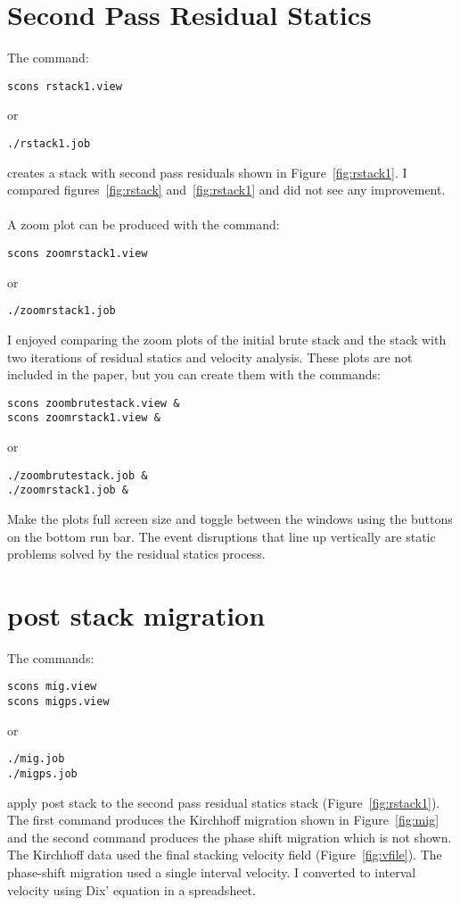 
\section{Second Pass Residual Statics}
The command:
\begin{verbatim}
scons rstack1.view
\end{verbatim}
or
\begin{verbatim}
./rstack1.job
\end{verbatim}
creates a stack with second pass residuals shown in Figure~\ref{fig:rstack1}.  
I compared figures~\ref{fig:rstack} and~\ref{fig:rstack1} and did not see 
any improvement.\\
\\  
A zoom plot can be produced with the command:
\begin{verbatim}
scons zoomrstack1.view
\end{verbatim}
or
\begin{verbatim}
./zoomrstack1.job
\end{verbatim}

I enjoyed comparing the zoom plots of the initial brute stack and the stack 
with two iterations of residual statics and velocity analysis.  These plots
are not included in the paper, but you can create them with the
commands:
\begin{verbatim}
scons zoombrutestack.view & 
scons zoomrstack1.view & 
\end{verbatim}
or
\begin{verbatim}
./zoombrutestack.job & 
./zoomrstack1.job & 
\end{verbatim}
Make the plots full screen size and toggle between the windows using the 
buttons on the bottom run bar.  The event disruptions that line up vertically
are static problems solved by the residual statics process.
  

\section{post stack migration}
The commands:
\begin{verbatim}
scons mig.view
scons migps.view
\end{verbatim}
or
\begin{verbatim}
./mig.job
./migps.job
\end{verbatim}
apply post stack to the second pass residual statics stack
(Figure~\ref{fig:rstack1}). The first command produces the Kirchhoff
migration shown in Figure~\ref{fig:mig} and the second command
produces the phase shift migration which is not shown.
The Kirchhoff data used the final stacking velocity field
(Figure~\ref{fig:vfile}).  The phase-shift migration used a single
interval velocity.  I converted to interval velocity using Dix'
equation \cite[]{GEO20-01-00680086} in a spreadsheet.

